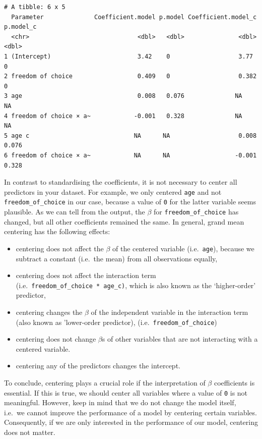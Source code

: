 \documentclass[
  letterpaper,
]{krantz}
\begin{document}
\begin{verbatim}
# A tibble: 6 x 5
  Parameter              Coefficient.model p.model Coefficient.model_c p.model_c
  <chr>                              <dbl>   <dbl>               <dbl>     <dbl>
1 (Intercept)                        3.42    0                   3.77      0    
2 freedom of choice                  0.409   0                   0.382     0    
3 age                                0.008   0.076              NA        NA    
4 freedom of choice × a~            -0.001   0.328              NA        NA    
5 age c                             NA      NA                   0.008     0.076
6 freedom of choice × a~            NA      NA                  -0.001     0.328
\end{verbatim}

In contrast to standardising the coefficients, it is not necessary to
center all predictors in your dataset. For example, we only centered
\texttt{age} and not \texttt{freedom\_of\_choice} in our case, because a
value of \texttt{0} for the latter variable seems plausible. As we can
tell from the output, the \(\beta\) for \texttt{freedom\_of\_choice} has
changed, but all other coefficients remained the same. In general, grand
mean centering has the following effects:

\begin{itemize}
\item
  centering does not affect the \(\beta\) of the centered variable
  (i.e.~\texttt{age}), because we subtract a constant (i.e.~the mean)
  from all observations equally,
\item
  centering does not affect the interaction term
  (i.e.~\texttt{freedom\_of\_choice\ *\ age\_c)}, which is also known as
  the `higher-order' predictor,
\item
  centering changes the \(\beta\) of the independent variable in the
  interaction term (also known as 'lower-order predictor),
  (i.e.~\texttt{freedom\_of\_choice})
\item
  centering does not change \(\beta\)s of other variables that are not
  interacting with a centered variable.
\item
  centering any of the predictors changes the intercept.
\end{itemize}

To conclude, centering plays a crucial role if the interpretation of
\(\beta\) coefficients is essential. If this is true, we should center
all variables where a value of \texttt{0} is not meaningful. However,
keep in mind that we do not change the model itself, i.e.~we cannot
improve the performance of a model by centering certain variables.
Consequently, if we are only interested in the performance of our model,
centering does not matter.
\end{document}
